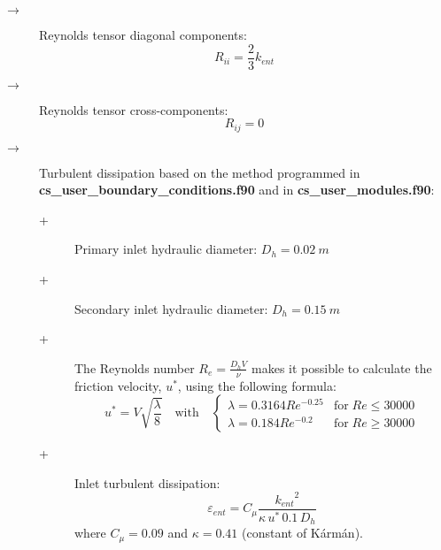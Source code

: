 \begin{itemize}
\begin{description}
\begin{description}
            \item[$\rightarrow$] Reynolds tensor diagonal components:
                  \begin{displaymath}
                     R_{ii} = \frac{2}{3} k_{ent}
                  \end{displaymath}

            \item[$\rightarrow$] Reynolds tensor cross-components:
                  \begin{displaymath}
                     R_{ij} = 0
                  \end{displaymath}

            \item[$\rightarrow$] Turbulent dissipation based on the method programmed in \textbf{cs\_user\_boundary\_conditions.f90} and in \textbf{cs\_user\_modules.f90}:
                  \begin{description}
                     \item[+] Primary inlet hydraulic diameter: $D_h=0.02~m$
                     \item[+] Secondary inlet hydraulic diameter: $D_h=0.15~m$
                     \item[+] The Reynolds number
                           $\displaystyle{R_e=\frac{D_h V}{\nu}}$ makes it possible to calculate the friction velocity, $u^*$, using the following formula:
                           \begin{displaymath}
                              u^* = V \sqrt{\frac{\lambda}{8}} \quad \text{with} \quad
                              \begin{cases}
                                 \displaystyle
                                 \lambda = 0.3164 Re^{-0.25} & \text{for} \; Re \leq 30000 \\
                                 \lambda = 0.184 Re^{-0.2}   & \text{for} \; Re \geq 30000
                              \end{cases}
                           \end{displaymath}
                     \item[+] Inlet turbulent dissipation:
                           \begin{displaymath}
                              \varepsilon_{ent} = C_{\mu} \frac{{k_{ent}}^2}{\kappa \, u^* \, 0.1 \, D_h}
                           \end{displaymath}
                           where $C_{\mu}=0.09$ and $\kappa=0.41$ (constant of K\'arm\'an).
                  \end{description}


\end{description}
\end{description}
\end{itemize}
